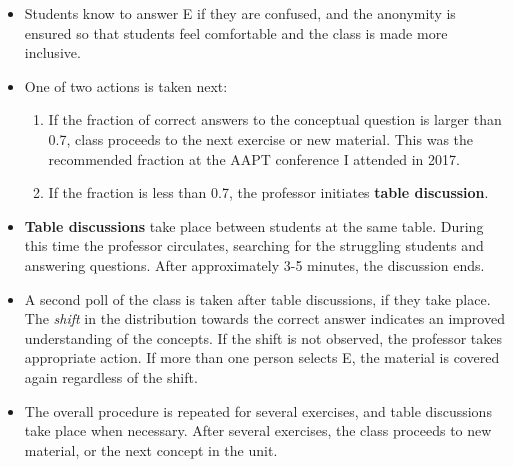 \documentclass[../../../main.tex]{subfiles}
\begin{document}
\begin{itemize}
\begin{figure}
\caption{\label{fig:exampleData} (Left) An answer distribution of my 25-student introductory algebra-based physics class, for a question that had a correct answer of A.  This distribution triggered a table discussion, because the fraction of correct answers was 0.6.  In addition, one student pressed E, indicating they were confused.  This prompts the professor to give a clue, or work another example.  (Right) After a table discussion with their peers, the students responded a second time, and the fraction of correct answers rose to 22/25 = 0.88.  The key concept for the question is that velocity and acceleration are not the same quantity (see text).}
\end{figure}
\item Students know to answer E if they are confused, and the anonymity is ensured so that students feel comfortable and the class is made more inclusive.
\item One of two actions is taken next:
\begin{enumerate}
\item If the fraction of correct answers to the conceptual question is larger than 0.7, class proceeds to the next exercise or new material.  This was the recommended fraction at the AAPT conference I attended in 2017.
\item If the fraction is less than 0.7, the professor initiates \textbf{table discussion}.
\end{enumerate}
\item \textbf{Table discussions} take place between students at the same table.  During this time the professor circulates, searching for the struggling students and answering questions.  After approximately 3-5 minutes, the discussion ends.
\item A second poll of the class is taken after table discussions, if they take place.  The \textit{shift} in the distribution towards the correct answer indicates an improved understanding of the concepts.  If the shift is not observed, the professor takes appropriate action.  If more than one person selects E, the material is covered again regardless of the shift.
\item The overall procedure is repeated for several exercises, and table discussions take place when necessary.  After several exercises, the class proceeds to new material, or the next concept in the unit.
\end{itemize}
\end{document}
